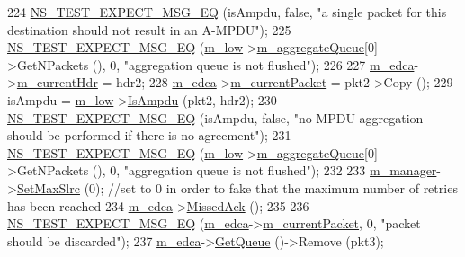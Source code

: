 \begin{DoxyCode}
224   \hyperlink{group__testing_ga7304ba46a28d8cf08dfdfd6499cf7068}{NS\_TEST\_EXPECT\_MSG\_EQ} (isAmpdu, \textcolor{keyword}{false}, \textcolor{stringliteral}{"a single packet for this destination should
       not result in an A-MPDU"});
225   \hyperlink{group__testing_ga7304ba46a28d8cf08dfdfd6499cf7068}{NS\_TEST\_EXPECT\_MSG\_EQ} (\hyperlink{classAmpduAggregationTest_a65f2d8fbd8b46a92ace2c371d2a091d9}{m\_low}->\hyperlink{classns3_1_1MacLow_a50ea30f5dff00a3ef2683b9275717c6f}{m\_aggregateQueue}[0]->GetNPackets 
      (), 0, \textcolor{stringliteral}{"aggregation queue is not flushed"});
226 
227   \hyperlink{classAmpduAggregationTest_aa073b38b49ac92944de917cd25fe46f4}{m\_edca}->\hyperlink{classns3_1_1DcaTxop_ae965eb2f4d504e00526e751cd1dab3a6}{m\_currentHdr} = hdr2;
228   \hyperlink{classAmpduAggregationTest_aa073b38b49ac92944de917cd25fe46f4}{m\_edca}->\hyperlink{classns3_1_1DcaTxop_a3c454c21337aac0944f86caad8b7a719}{m\_currentPacket} = pkt2->Copy ();
229   isAmpdu = \hyperlink{classAmpduAggregationTest_a65f2d8fbd8b46a92ace2c371d2a091d9}{m\_low}->\hyperlink{classns3_1_1MacLow_a228f675a7db0df0e39edb611167861cc}{IsAmpdu} (pkt2, hdr2);
230   \hyperlink{group__testing_ga7304ba46a28d8cf08dfdfd6499cf7068}{NS\_TEST\_EXPECT\_MSG\_EQ} (isAmpdu, \textcolor{keyword}{false}, \textcolor{stringliteral}{"no MPDU aggregation should be performed if
       there is no agreement"});
231   \hyperlink{group__testing_ga7304ba46a28d8cf08dfdfd6499cf7068}{NS\_TEST\_EXPECT\_MSG\_EQ} (\hyperlink{classAmpduAggregationTest_a65f2d8fbd8b46a92ace2c371d2a091d9}{m\_low}->\hyperlink{classns3_1_1MacLow_a50ea30f5dff00a3ef2683b9275717c6f}{m\_aggregateQueue}[0]->GetNPackets 
      (), 0, \textcolor{stringliteral}{"aggregation queue is not flushed"});
232 
233   \hyperlink{classAmpduAggregationTest_abd162c86cd5eb8e4146bcacd20ccc312}{m\_manager}->\hyperlink{classns3_1_1WifiRemoteStationManager_af9bf74dff1a083929967fd324d17c4c0}{SetMaxSlrc} (0); \textcolor{comment}{//set to 0 in order to fake that the maximum number of
       retries has been reached}
234   \hyperlink{classAmpduAggregationTest_aa073b38b49ac92944de917cd25fe46f4}{m\_edca}->\hyperlink{classns3_1_1EdcaTxopN_ad16ece50ac2937e5cdfeae010d4b5c88}{MissedAck} ();
235 
236   \hyperlink{group__testing_ga7304ba46a28d8cf08dfdfd6499cf7068}{NS\_TEST\_EXPECT\_MSG\_EQ} (\hyperlink{classAmpduAggregationTest_aa073b38b49ac92944de917cd25fe46f4}{m\_edca}->\hyperlink{classns3_1_1DcaTxop_a3c454c21337aac0944f86caad8b7a719}{m\_currentPacket}, 0, \textcolor{stringliteral}{"packet
       should be discarded"});
237   \hyperlink{classAmpduAggregationTest_aa073b38b49ac92944de917cd25fe46f4}{m\_edca}->\hyperlink{classns3_1_1DcaTxop_a6c89d0aeccbc5e8724d404bc45f796d7}{GetQueue} ()->Remove (pkt3);

\end{DoxyCode}
